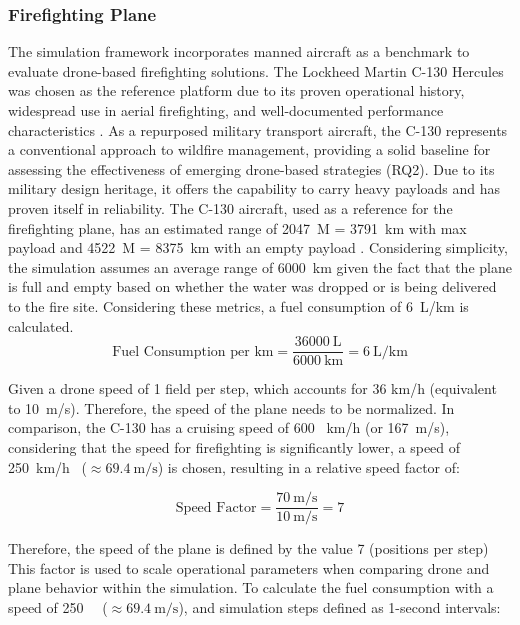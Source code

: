 \documentclass[11pt, a4paper]{article}
\begin{document}
\newpage
\subsubsection{Firefighting Plane}
\label{sec:PlaneAgent}

The simulation framework incorporates manned aircraft as a benchmark to evaluate drone-based firefighting solutions. The Lockheed Martin C-130 Hercules was chosen as the reference platform due to its proven operational history, widespread use in aerial firefighting, and well-documented performance characteristics \citep{LockheedC130Hercules2022}. As a repurposed military transport aircraft, the C-130 represents a conventional approach to wildfire management, providing a solid baseline for assessing the effectiveness of emerging drone-based strategies (RQ2). Due to its military design heritage, it offers the capability to carry heavy payloads and has proven itself in reliability.
The C-130 aircraft, used as a reference for the firefighting plane, has an estimated range of \SI{2047}{\nauticalmile} = \SI{3791}{\kilo\meter} with max payload and \SI{4522}{\nauticalmile} = \SI{8375}{\kilo\meter} with an empty payload \citep{LockheedC130Hercules2022}. Considering simplicity, the simulation assumes an average range of \SI{6000}{\kilo\meter} given the fact that the plane is full and empty based on whether the water was dropped or is being delivered to the fire site. Considering these metrics, a fuel consumption of \SI{6}{\liter}/km is calculated.
\[
\text{Fuel Consumption per km} =\frac{36000~\text{L}}{6000~\text{km}} = 6~\text{L/km}
\]

Given a drone speed of 1 field per step, which accounts for 36 km/h \citep{DJIAGRAST50} (equivalent to 10~m/s). Therefore, the speed of the plane needs to be normalized. In comparison, the C-130 has a cruising speed of 600 ~km/h \citep{LockheedC130Hercules2022} (or 167~m/s), considering that the speed for firefighting is significantly lower, a speed of 250~km/h \ (\(\approx 69.4~\text{m/s}\)) is chosen, resulting in a relative speed factor of:

\begin{equation}
\text{Speed Factor}= \frac{70~\text{m/s}}{10~\text{m/s}} = 7
\end{equation}

Therefore, the speed of the plane is defined by the value 7 (positions per step)
This factor is used to scale operational parameters when comparing drone and plane behavior within the simulation. To calculate the fuel consumption with a speed of 250~ \ (\(\approx 69.4~\text{m/s}\)), and simulation steps defined as 1-second intervals:
\end{document}
